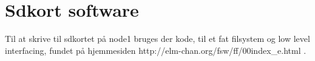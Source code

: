 \section{Sdkort software}
Til at skrive til sdkortet på node1 bruges der kode, til et fat filsystem og low level interfacing, fundet på hjemmesiden http://elm-chan.org/fsw/ff/00index\_e.html \citep{chan}.
